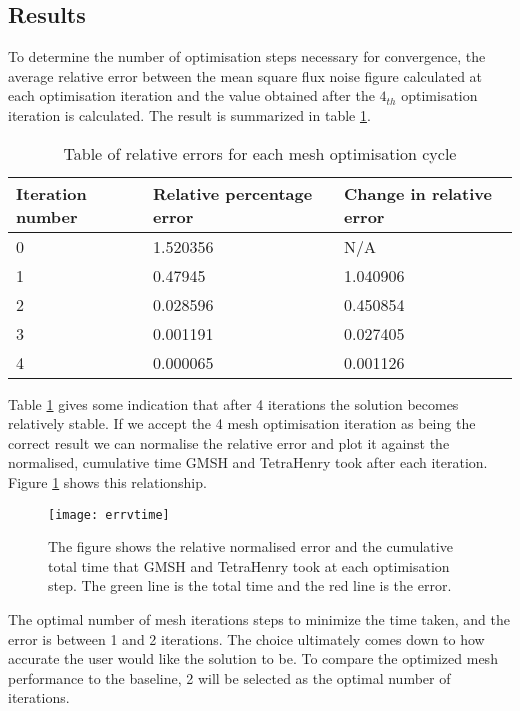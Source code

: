 \subsection{Results}

To determine the number of optimisation steps necessary for convergence, the average relative error between the mean square flux noise figure calculated at each optimisation iteration and the value obtained after the $4_{th}$ optimisation iteration is calculated. The result is summarized in table \ref{tab:relerr}.


\begin{table}[H]
    \centering
    \begin{tabular}{lll}
    \hline
    Iteration number & Relative percentage error & Change in relative error \\ \hline
    0                & 1.520356                  & N/A                      \\
    1                & 0.47945                   & 1.040906                 \\
    2                & 0.028596                  & 0.450854                 \\
    3                & 0.001191                  & 0.027405                 \\
    4                & 0.000065                  & 0.001126                 \\ \hline         
    \end{tabular}
    \caption{Table of relative errors for each mesh optimisation cycle}
    \label{tab:relerr}
\end{table}

Table \ref{tab:relerr} gives some indication that after 4 iterations the solution becomes relatively stable. If we accept the 4 mesh optimisation iteration as being the correct result we can normalise the relative error and plot it against the normalised, cumulative time GMSH and TetraHenry took after each iteration. Figure \ref{fig:errvtime} shows this relationship.

\begin{figure}[H]
    \centering
    \texttt{[image: errvtime]}
    \caption{The figure shows the relative normalised error and the cumulative total time that GMSH and TetraHenry took at each optimisation step. The green line is the total time and the red line is the error.}
    \label{fig:errvtime}
\end{figure}

The optimal number of mesh iterations steps to minimize the time taken, and the error is between 1 and 2 iterations. The choice ultimately comes down to how accurate the user would like the solution to be. To compare the optimized mesh performance to the baseline, 2 will be selected as the optimal number of iterations. \par

